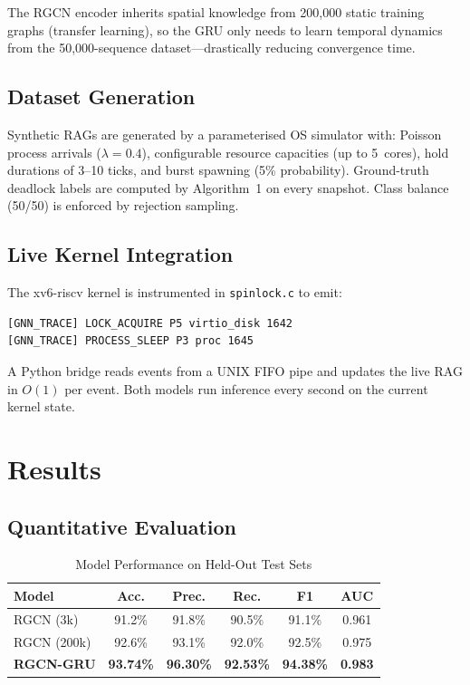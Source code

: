 \documentclass[conference]{IEEEtran}
\begin{document}
The RGCN encoder inherits spatial knowledge from 200,000 static training graphs
(transfer learning), so the GRU only needs to learn temporal dynamics from the
50,000-sequence dataset—drastically reducing convergence time.

\subsection{Dataset Generation}

Synthetic RAGs are generated by a parameterised OS simulator with:
Poisson process arrivals ($\lambda = 0.4$), configurable resource capacities
(up to 5~cores), hold durations of 3–10 ticks, and burst spawning (5\%
probability). Ground-truth deadlock labels are computed by Algorithm~1 on every
snapshot. Class balance (50/50) is enforced by rejection sampling.

\subsection{Live Kernel Integration}

The xv6-riscv kernel is instrumented in \texttt{spinlock.c} to emit:
\begin{verbatim}
[GNN_TRACE] LOCK_ACQUIRE P5 virtio_disk 1642
[GNN_TRACE] PROCESS_SLEEP P3 proc 1645
\end{verbatim}
A Python bridge reads events from a UNIX FIFO pipe and updates the live RAG
in $O(1)$ per event. Both models run inference every second on the current
kernel state.

\section{Results}

\subsection{Quantitative Evaluation}

\begin{table}[H]
\centering
\caption{Model Performance on Held-Out Test Sets}
\begin{tabular}{lccccc}
\toprule
\textbf{Model} & \textbf{Acc.} & \textbf{Prec.} & \textbf{Rec.} & \textbf{F1} & \textbf{AUC} \\
\midrule
RGCN (3k)          & 91.2\% & 91.8\% & 90.5\% & 91.1\% & 0.961 \\
RGCN (200k)        & 92.6\% & 93.1\% & 92.0\% & 92.5\% & 0.975 \\
\textbf{RGCN-GRU}  & \textbf{93.74\%} & \textbf{96.30\%} & \textbf{92.53\%} & \textbf{94.38\%} & \textbf{0.983} \\
\bottomrule
\end{tabular}
\end{table}
\end{document}
